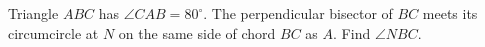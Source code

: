 Triangle $ABC$ has $\angle CAB=80^\circ$. The perpendicular bisector of $BC$ meets its circumcircle at $N$ on the same side of chord $BC$ as $A$. Find $\angle NBC$.
